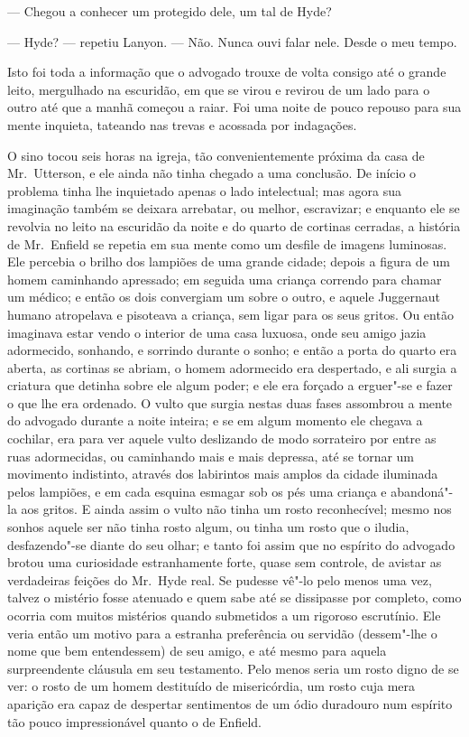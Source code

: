 --- Chegou a conhecer um protegido dele, um tal de Hyde?

--- Hyde? --- repetiu Lanyon. --- Não.  Nunca ouvi falar nele.  Desde o meu
tempo.

Isto foi toda a informação que o advogado trouxe de volta consigo até o
grande leito, mergulhado na escuridão, em que se virou e revirou de um
lado para o outro até que a manhã começou a raiar.  Foi uma noite de
pouco repouso para sua mente inquieta, tateando nas trevas e acossada
por indagações.

O sino tocou seis horas na igreja, tão convenientemente próxima da casa
de Mr.~Utterson, e ele ainda não tinha chegado a uma conclusão.  De
início o problema tinha lhe inquietado apenas o lado intelectual; mas
agora sua imaginação também se deixara arrebatar, ou melhor,
escravizar; e enquanto ele se revolvia no leito na escuridão da noite e
do quarto de cortinas cerradas, a história de Mr.~Enfield se repetia em
sua mente como um desfile de imagens luminosas.  Ele percebia o brilho
dos lampiões de uma grande cidade; depois a figura de um homem
caminhando apressado; em seguida uma criança correndo para chamar um
médico; e então os dois convergiam um sobre o outro, e aquele
Juggernaut humano atropelava e pisoteava a criança, sem ligar para os
seus gritos.  Ou então imaginava estar vendo o interior de uma casa
luxuosa, onde seu amigo jazia adormecido, sonhando, e sorrindo durante
o sonho; e então a porta do quarto era aberta, as cortinas se abriam, o
homem adormecido era despertado, e ali surgia a criatura que detinha
sobre ele algum poder; e ele era forçado a erguer"-se e fazer o que lhe
era ordenado.  O vulto que surgia nestas duas fases assombrou a mente
do advogado durante a noite inteira; e se em algum momento ele chegava
a cochilar, era para ver aquele vulto deslizando de modo sorrateiro por
entre as ruas adormecidas, ou caminhando mais e mais depressa, até se
tornar um movimento indistinto, através dos labirintos mais amplos da
cidade iluminada pelos lampiões, e em cada esquina esmagar sob os pés
uma criança e abandoná"-la aos gritos.  E ainda assim o vulto não tinha
um rosto reconhecível; mesmo nos sonhos aquele ser não tinha rosto
algum, ou tinha um rosto que o iludia, desfazendo"-se diante do seu
olhar; e tanto foi assim que no espírito do advogado brotou uma
curiosidade estranhamente forte, quase sem controle, de avistar as
verdadeiras feições do Mr.~Hyde real.  Se pudesse vê"-lo pelo menos uma
vez, talvez o mistério fosse atenuado e quem sabe até se dissipasse por
completo, como ocorria com muitos mistérios quando submetidos a um
rigoroso escrutínio.  Ele veria então um motivo para a estranha
preferência ou servidão (dessem"-lhe o nome que bem entendessem) de seu
amigo, e até mesmo para aquela surpreendente cláusula em seu
testamento.  Pelo menos seria um rosto digno de se ver: o rosto de um
homem destituído de misericórdia, um rosto cuja mera aparição era capaz
de despertar sentimentos de um ódio duradouro num espírito tão pouco
impressionável quanto o de Enfield.

